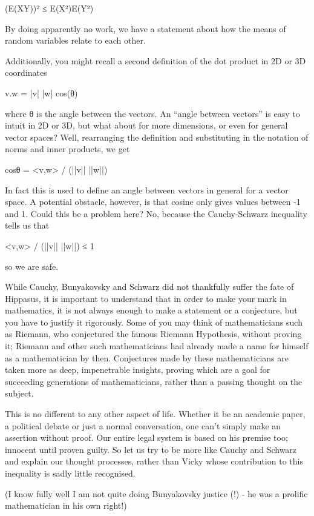(E(XY))² ≤ E(X²)E(Y²)

By doing apparently no work, we have a statement about how the means of random variables relate to each other.

Additionally, you might recall a second definition of the dot product in 2D or 3D coordinates

v.w = |v| |w| cos(θ)

where θ is the angle between the vectors. An “angle between vectors” is easy to intuit in 2D or 3D, but what about for more dimensions, or even for general vector spaces? Well, rearranging the definition and substituting in the notation of norms and inner products, we get

cosθ = <v,w> / (||v|| ||w||)

In fact this is used to define an angle between vectors in general for a vector space. A potential obstacle, however, is that cosine only gives values between -1 and 1. Could this be a problem here? No, because the Cauchy-Schwarz inequality tells us that

<v,w> / (||v|| ||w||) ≤ 1

so we are safe.

While Cauchy, Bunyakovsky and Schwarz did not thankfully suffer the fate of Hippasus, it is important to understand that in order to make your mark in mathematics, it is not always enough to make a statement or a conjecture, but you have to justify it rigorously. Some of you may think of mathematicians such as Riemann, who conjectured the famous Riemann Hypothesis, without proving it; Riemann and other such mathematicians had already made a name for himself as a mathematician by then. Conjectures made by these mathematicians are taken more as deep, impenetrable insights, proving which are a goal for succeeding generations of mathematicians, rather than a passing thought on the subject.

This is no different to any other aspect of life. Whether it be an academic paper, a political debate or just a normal conversation, one can’t simply make an assertion without proof. Our entire legal system is based on his premise too; innocent until proven guilty. So let us try to be more like Cauchy and Schwarz and explain our thought processes, rather than Vicky whose contribution to this inequality is sadly little recognised.

(I know fully well I am not quite doing Bunyakovsky justice (!) - he was a prolific mathematician in his own right!)
